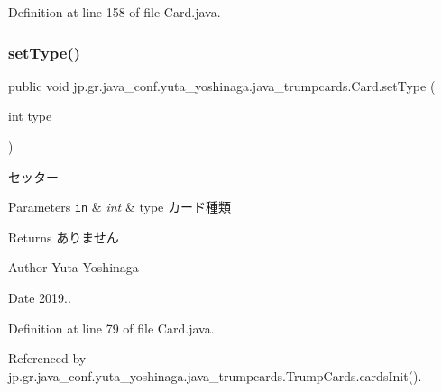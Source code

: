 Definition at line 158 of file Card.\+java.

\mbox{\label{classjp_1_1gr_1_1java__conf_1_1yuta__yoshinaga_1_1java__trumpcards_1_1_card_a23261f01f6e562e720b5cf55919f1342}} 
\subsubsection{\texorpdfstring{set\+Type()}{setType()}}
{\footnotesize\ttfamily public void jp.\+gr.\+java\+\_\+conf.\+yuta\+\_\+yoshinaga.\+java\+\_\+trumpcards.\+Card.\+set\+Type (\begin{DoxyParamCaption}\item[{int}]{type }\end{DoxyParamCaption})}



セッター 


\begin{DoxyParams}[1]{Parameters}
\mbox{\tt in}  & {\em int} & type カード種類 \\
\hline
\end{DoxyParams}
\begin{DoxyReturn}{Returns}
ありません 
\end{DoxyReturn}
\begin{DoxyAuthor}{Author}
Yuta Yoshinaga 
\end{DoxyAuthor}
\begin{DoxyDate}{Date}
2019.. 
\end{DoxyDate}


Definition at line 79 of file Card.\+java.



Referenced by jp.\+gr.\+java\+\_\+conf.\+yuta\+\_\+yoshinaga.\+java\+\_\+trumpcards.\+Trump\+Cards.\+cards\+Init().

